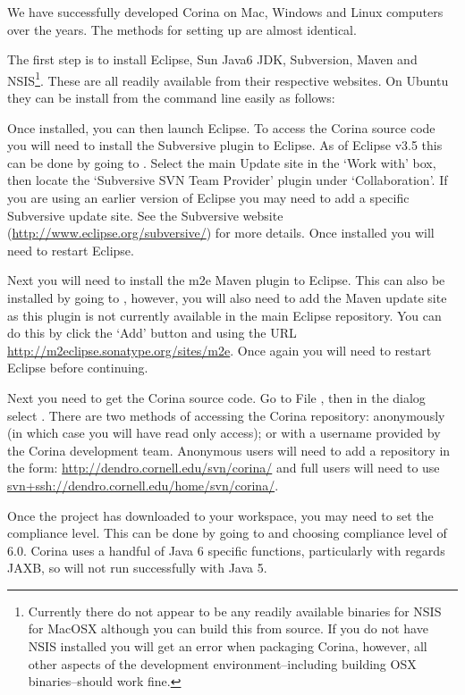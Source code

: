 We have successfully developed Corina on Mac, Windows and Linux computers over the years.  The methods for setting up are almost identical.  

The first step is to install Eclipse, Sun Java6 JDK, Subversion, Maven and NSIS\footnote{Currently there do not appear to be any readily available binaries for NSIS for MacOSX although you can build this from source.  If you do not have NSIS installed you will get an error when packaging Corina, however, all other aspects of the development environment--including building OSX binaries--should work fine.}.  These are all readily available from their respective websites.  On Ubuntu they can be install from the command line easily as follows:


Once installed, you can then launch Eclipse.  To access the Corina source code you will need to install the Subversive plugin to Eclipse.  As of Eclipse v3.5 this can be done by going to .  Select the main Update site in the `Work with' box, then locate the `Subversive SVN Team Provider' plugin under `Collaboration'.  If you are using an earlier version of Eclipse you may need to add a specific Subversive update site.  See the Subversive website (\url{http://www.eclipse.org/subversive/}) for more details.  Once installed you will need to restart Eclipse.

Next you will need to install the m2e Maven plugin to Eclipse.  This can also be installed by going to , however, you will also need to add the Maven update site as this plugin is not currently available in the main Eclipse repository.  You can do this by click the `Add' button and using the URL \url{http://m2eclipse.sonatype.org/sites/m2e}.  Once again you will need to restart Eclipse before continuing.

Next you need to get the Corina source code.  Go to File , then in the dialog select .  There are two methods of accessing the Corina repository: anonymously (in which case you will have read only access); or with a username provided by the Corina development team.  Anonymous users will need to add a repository in the form: \url{http://dendro.cornell.edu/svn/corina/} and full users will need to use \url{svn+ssh://dendro.cornell.edu/home/svn/corina/}.

Once the project has downloaded to your workspace, you may need to set the compliance level.  This can be done by going to  and choosing compliance level of 6.0.  Corina uses a handful of Java 6 specific functions, particularly with regards JAXB, so will not run successfully with Java 5.  

